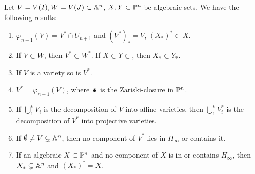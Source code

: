     \begin{lemma}\label{ConnectionBetweenAffineAlgebraicSetsAndProjectiveAlgebraicSets}
        Let $V=V(I),W=V(J)\subset \mathbb{A}^n$, $X,Y\subset \mathbb{P}^n$ be algebraic sets. We have the following results:
        \begin{enumerate}
            \item $\varphi_{n+1}(V)= V^\ast\cap U_{n+1}$ and $(V^\ast)_\ast=V$, $(X_\ast)^\ast \subset X$.
            \item If $V\subset W$, then $V^\ast \subset W^\ast$. If $X\subset Y\subset $, then $X_\ast \subset Y_\ast$.
            \item If $V$ is a variety so is $V^\ast$.
            \item $V^\ast = \overline{\varphi_{n+1}(V)}$, where $\overline{\bullet}$ is the Zariski-closure in $\mathbb{P}^n$.
            \item If $\bigcup_1^k V_i$ is the decomposition of $V$ into affine varieties, then $\bigcup_1^k V_i^\ast$ is the decomposition of $V^\ast$ into projective varieties.
            \item If $\emptyset \neq V \subsetneq \mathbb{A}^n$, then no component of $V^\ast$ lies in $H_\infty$ or contains it.
            \item If an algebraic $X\subset \mathbb{P}^n$ and no component of $X$ is in or contains $H_\infty$, then $X_\ast \subsetneq \mathbb{A}^n$ and $(X_\ast)^\ast = X$.
        \end{enumerate}
    \end{lemma}
